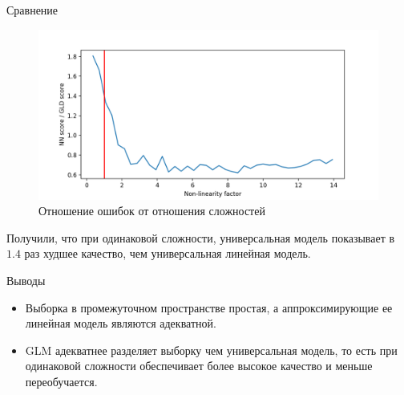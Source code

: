 \documentclass{beamer}
\begin{document}
\begin{frame}{Сравнение}
    \begin{figure}[ht]
        \centering
          \includegraphics[width=\textwidth]{../pics/loss_and_std_of_nl_factor.png}
          \caption{Отношение ошибок от отношения сложностей}
    \end{figure}

    Получили, что при одинаковой сложности, универсальная модель показывает
    в $1.4$ раз худшее качество, чем универсальная линейная модель.

\end{frame}
\begin{frame}{Выводы}
    \begin{itemize}
        \item Выборка в промежуточном пространстве простая,
        а аппроксимирующие ее линейная модель являются адекватной.
        \item GLM адекватнее разделяет выборку чем универсальная модель, то есть
        при одинаковой сложности обеспечивает более высокое качество и меньше переобучается.
    \end{itemize}
\end{frame}

\end{document}
